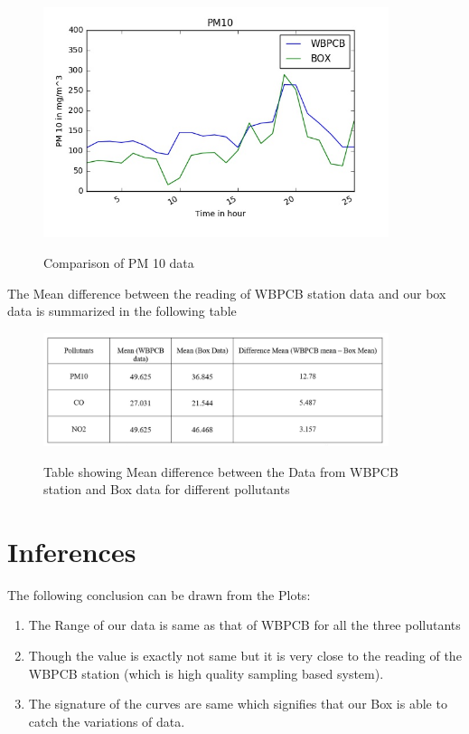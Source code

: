 \begin{figure}[!htbp]
	\centering
	\includegraphics[width=0.9\textwidth]{pm10_compare.jpg}
	\label{fig:Comparison of PM 10 data}
	\caption{Comparison of PM 10 data}
\end{figure}

The Mean difference between the reading of WBPCB station data and our box data is summarized in the following table

\begin{figure}[!htbp]
	\centering
	\includegraphics[width=0.9\textwidth]{table.jpg}
	\label{fig:Table showing Mean difference between the Data from WBPCB station and Box data for different pollutants}
	\caption{Table showing Mean difference between the Data from WBPCB station and Box data for different pollutants}
\end{figure}

\newpage
\section{Inferences}

The following conclusion can be drawn from the Plots:

\begin{enumerate}
	\item The Range of our data is same as that of WBPCB for all the three pollutants
	\item Though the value is exactly not same but it is very close to the reading of the WBPCB station (which is high quality sampling based system).
	\item The signature of the curves are same which signifies that our Box is able to catch the variations of data.
\end{enumerate}